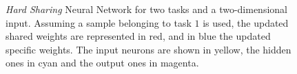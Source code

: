 \begin{figure}[t!]
    \caption{\emph{Hard Sharing} Neural Network for two tasks and a two-dimensional input. Assuming a sample belonging to task $1$ is used, the updated shared weights are represented in red, and in blue the updated specific weights. 
    The input neurons are shown in yellow, the hidden ones in cyan and the output ones in magenta.
    }
    \label{fig:hardsharing_nn}
\end{figure}